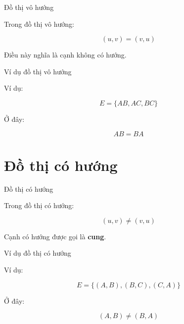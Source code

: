 \documentclass{beamer}
\begin{document}
\begin{frame}{Đồ thị vô hướng}

Trong đồ thị vô hướng:

\[
(u,v)=(v,u)
\]

Điều này nghĩa là cạnh không có hướng.

\end{frame}

\begin{frame}{Ví dụ đồ thị vô hướng}

\begin{center}


\end{center}

Ví dụ:

\[
E=\{AB,AC,BC\}
\]

Ở đây:

\[
AB = BA
\]

\end{frame}

\section{Đồ thị có hướng}

\begin{frame}{Đồ thị có hướng}

Trong đồ thị có hướng:

\[
(u,v) \ne (v,u)
\]

Cạnh có hướng được gọi là \textbf{cung}.

\end{frame}

\begin{frame}{Ví dụ đồ thị có hướng}

\begin{center}


\end{center}

Ví dụ:

\[
E=\{(A,B),(B,C),(C,A)\}
\]

Ở đây:

\[
(A,B)\ne(B,A)
\]

\end{frame}
\end{document}

